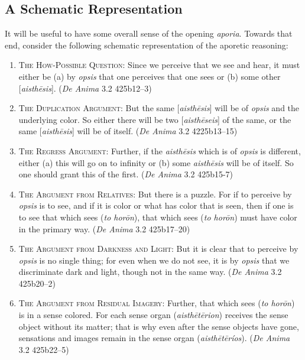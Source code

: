 \subsection{A Schematic Representation} %
\label{sub:a_schematic_representation}

It will be useful to have some overall sense of the opening \emph{aporia}. Towards that end, consider the following schematic representation of the aporetic reasoning:

\begin{enumerate}[(1)]
	\item \textsc{The How-Possible Question}: Since we perceive that we see and hear, it must either be (a) by \emph{opsis} that one perceives that one sees or (b) some other [\emph{aisthēsis}]. (\emph{De Anima} 3.2 425b12–3)
	\item \textsc{The Duplication Argument}: But the same [\emph{aisthēsis}] will be of \emph{opsis} and the underlying color. So either there will be two [\emph{aisthēseis}] of the same, or the same [\emph{aisthēsis}] will be of itself. (\emph{De Anima} 3.2 4225b13–15)
	\item \textsc{The Regress Argument}: Further, if the \emph{aisthēsis} which is of \emph{opsis} is different, either (a) this will go on to infinity or (b) some \emph{aisthēsis} will be of itself. So one should grant this of the first. (\emph{De Anima} 3.2 425b15-7)
	\item \textsc{The Argument from Relatives}: But there is a puzzle. For if to perceive by \emph{opsis} is to see, and if it is color or what has color that is seen, then if one is to see that which sees (\emph{to horōn}), that which sees (\emph{to horōn}) must have color in the primary way. (\emph{De Anima} 3.2 425b17–20)
	\item \textsc{The Argument from Darkness and Light}: But it is clear that to perceive by \emph{opsis} is no single thing; for even when we do not see, it is by \emph{opsis} that we discriminate dark and light, though not in the same way. (\emph{De Anima} 3.2 425b20–2)
	\item \textsc{The Argument from Residual Imagery}: Further, that which sees (\emph{to horōn}) is in a sense colored. For each sense organ (\emph{aisthētērion}) receives the sense object without its matter; that is why even after the sense objects have gone, sensations and images remain in the sense organ (\emph{aisthētēríos}). (\emph{De Anima} 3.2 425b22–5)
\end{enumerate} 

